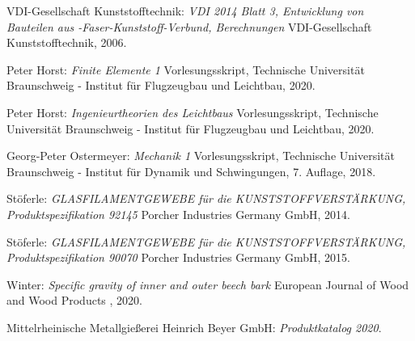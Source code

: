 \begin{thebibliography}{99}
	VDI-Gesellschaft Kunststofftechnik:
	\textit{VDI 2014 Blatt 3, Entwicklung von Bauteilen aus -Faser-Kunststoff-Verbund, Berechnungen}
	VDI-Gesellschaft Kunststofftechnik, 2006.
	
	Peter Horst:
	\textit{Finite Elemente 1}
	Vorlesungsskript, Technische Universität Braunschweig - Institut für Flugzeugbau und Leichtbau, 2020.
	
	Peter Horst:
	\textit{Ingenieurtheorien des Leichtbaus}
	Vorlesungsskript, Technische Universität Braunschweig - Institut für Flugzeugbau und Leichtbau, 2020.
	
	Georg-Peter Ostermeyer:
	\textit{Mechanik 1}
	Vorlesungsskript, Technische Universität Braunschweig - Institut für Dynamik und Schwingungen, 7. Auflage, 2018.
	
	Stöferle:
	\textit{GLASFILAMENTGEWEBE für die KUNSTSTOFFVERSTÄRKUNG, Produktspezifikation 92145}
	Porcher Industries Germany GmbH, 2014.
	
	Stöferle:
	\textit{GLASFILAMENTGEWEBE für die KUNSTSTOFFVERSTÄRKUNG, Produktspezifikation 90070}
	Porcher Industries Germany GmbH, 2015.
	
	Winter:
	\textit{Specific gravity of inner and outer beech bark}
	European Journal of Wood and Wood Products , 2020.
	
	Mittelrheinische Metallgießerei Heinrich Beyer GmbH:
	\textit{Produktkatalog 2020}.
	
	
	
\end{thebibliography}
\endgroup